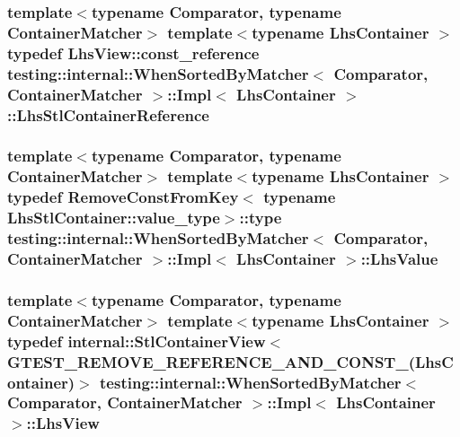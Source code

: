 \subsubsection[{\texorpdfstring{Lhs\+Stl\+Container\+Reference}{LhsStlContainerReference}}]{\setlength{\rightskip}{0pt plus 5cm}template$<$typename Comparator, typename Container\+Matcher$>$ template$<$typename Lhs\+Container $>$ typedef {\bf Lhs\+View\+::const\+\_\+reference} {\bf testing\+::internal\+::\+When\+Sorted\+By\+Matcher}$<$ Comparator, Container\+Matcher $>$\+::{\bf Impl}$<$ Lhs\+Container $>$\+::{\bf Lhs\+Stl\+Container\+Reference}}\hypertarget{classtesting_1_1internal_1_1WhenSortedByMatcher_1_1Impl_ab5e53a762bb213ccf84299b31c825b58}{}\label{classtesting_1_1internal_1_1WhenSortedByMatcher_1_1Impl_ab5e53a762bb213ccf84299b31c825b58}
\subsubsection[{\texorpdfstring{Lhs\+Value}{LhsValue}}]{\setlength{\rightskip}{0pt plus 5cm}template$<$typename Comparator, typename Container\+Matcher$>$ template$<$typename Lhs\+Container $>$ typedef {\bf Remove\+Const\+From\+Key}$<$ typename Lhs\+Stl\+Container\+::value\+\_\+type$>$\+::type {\bf testing\+::internal\+::\+When\+Sorted\+By\+Matcher}$<$ Comparator, Container\+Matcher $>$\+::{\bf Impl}$<$ Lhs\+Container $>$\+::{\bf Lhs\+Value}}\hypertarget{classtesting_1_1internal_1_1WhenSortedByMatcher_1_1Impl_a93044f4ba53373fcfc424132b5e6c462}{}\label{classtesting_1_1internal_1_1WhenSortedByMatcher_1_1Impl_a93044f4ba53373fcfc424132b5e6c462}
\subsubsection[{\texorpdfstring{Lhs\+View}{LhsView}}]{\setlength{\rightskip}{0pt plus 5cm}template$<$typename Comparator, typename Container\+Matcher$>$ template$<$typename Lhs\+Container $>$ typedef {\bf internal\+::\+Stl\+Container\+View}$<$ {\bf G\+T\+E\+S\+T\+\_\+\+R\+E\+M\+O\+V\+E\+\_\+\+R\+E\+F\+E\+R\+E\+N\+C\+E\+\_\+\+A\+N\+D\+\_\+\+C\+O\+N\+S\+T\+\_\+}(Lhs\+Container)$>$ {\bf testing\+::internal\+::\+When\+Sorted\+By\+Matcher}$<$ Comparator, Container\+Matcher $>$\+::{\bf Impl}$<$ Lhs\+Container $>$\+::{\bf Lhs\+View}}\hypertarget{classtesting_1_1internal_1_1WhenSortedByMatcher_1_1Impl_a4c84fddfe1bf967a73e5dae1940db427}{}\label{classtesting_1_1internal_1_1WhenSortedByMatcher_1_1Impl_a4c84fddfe1bf967a73e5dae1940db427}


